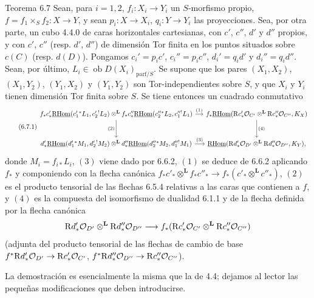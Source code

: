 \begin{statement}{Teorema 6.7}
Sean, para $i=1,2$, $f_i:X_i\to Y_i$ un $S$-morfismo propio, $f=f_1\times_Sf_2:X\to Y$, y sean $p_i:X\to X_i$, $q_i:Y\to Y_i$ las proyecciones. Sea, por otra parte, un cubo 4.4.0 de caras horizontales cartesianas, con $c'$, $c''$, $d'$ y $d''$ propios, y con $c'$, $c''$ (resp. $d'$, $d''$) de dimensión Tor finita en los puntos situados sobre $c(C)$ (resp. $d(D)$). Pongamos $c_i'=p_ic'$, $c_i''=p_ic''$, $d_i'=q_id'$ y $d_i''=q_id''$. Sean, por último, $L_i\in\operatorname{ob}D(X_i)_{\mathrm{parf}/S}$. Se supone que los pares $(X_1,X_2)$, $(X_1,Y_2)$, $(Y_1,X_2)$ y $(Y_1,Y_2)$ son Tor-independientes sobre $S$, y que $X_i$ y $Y_i$ tienen dimensión Tor finita sobre $S$. Se tiene entonces un cuadrado conmutativo
\begin{equation}
\tag{6.7.1}
\begin{tikzcd}[column sep=small,row sep=large]
f_*c'_*\uRHom(c_1'{}^*L_1,c_2'{}^!L_2)\otimes^{\mathbf L} f_*c''_*\uRHom(c_2''{}^*L_2,c_1''{}^!L_1) \arrow[r,"(1)"] \arrow[d,"(2)"']
& f_*\uRHom(\R c'_*\cO_{C'}\otimes^{\mathbf L}\R c''_*\cO_{C''},K_X) \arrow[d,"(4)"] \\
d'_*\uRHom(d_1'{}^*M_1,d_2'{}^!M_2)\otimes^{\mathbf L} d''_*\uRHom(d_2''{}^*M_2,d_1''{}^!M_1) \arrow[r,"(3)"]
& \uRHom(\R d'_*\cO_{D'}\otimes^{\mathbf L}\R d''_*\cO_{D''},K_Y),
\end{tikzcd}
\end{equation}
donde $M_i=f_{i*}L_i$, $(3)$ viene dado por 6.6.2, $(1)$ se deduce de 6.6.2 aplicando $f_*$ y componiendo con la flecha canónica $f_*c'_*\otimes^{\mathbf L} f_*c''_*\to f_*(c'_*\otimes^{\mathbf L} c''_*)$, $(2)$ es el producto tensorial de las flechas 6.5.4 relativas a las caras que contienen a $f$, y $(4)$ es la compuesta del isomorfismo de dualidad 6.1.1 y de la flecha definida por la flecha canónica
\[
\mathrm{R} d'_*\mathcal{O}_{D'}\otimes^{\mathbf L}\mathrm{R} d''_*\mathcal{O}_{D''}\longrightarrow f_*(\mathrm{R} c'_*\mathcal{O}_{C'}\otimes^{\mathbf L}\mathrm{R} c''_*\mathcal{O}_{C''})
\]
(adjunta del producto tensorial de las flechas de cambio de base $f^*\mathrm{R} d'_*\mathcal{O}_{D'}\to \mathrm{R} c'_*\mathcal{O}_{C'}$, $f^*\mathrm{R} d''_*\mathcal{O}_{D''}\to \mathrm{R} c''_*\mathcal{O}_{C''}$).
\end{statement}

La demostración es esencialmente la misma que la de 4.4; dejamos al lector las pequeñas modificaciones que deben introducirse.

